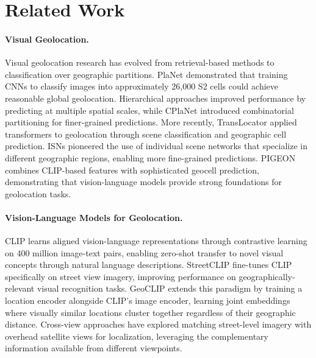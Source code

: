 \documentclass{uva-inf-article}
\begin{document}

\section{Related Work}
\label{sec:related}

\paragraph{Visual Geolocation.}
Visual geolocation research has evolved from retrieval-based methods \parencite{hays2008im2gps} to classification over geographic partitions. PlaNet \parencite{weyand2016planet} demonstrated that training CNNs to classify images into approximately 26,000 S2 cells \parencite{s2geometry} could achieve reasonable global geolocation. Hierarchical approaches \parencite{muller2018geolocation} improved performance by predicting at multiple spatial scales, while CPlaNet \parencite{seo2018cpl} introduced combinatorial partitioning for finer-grained predictions. More recently, TransLocator \parencite{pramanick2022world} applied transformers to geolocation through scene classification and geographic cell prediction. ISNs \parencite{muller2018geolocation} pioneered the use of individual scene networks that specialize in different geographic regions, enabling more fine-grained predictions. PIGEON \parencite{haas2024pigeon} combines CLIP-based features with sophisticated geocell prediction, demonstrating that vision-language models provide strong foundations for geolocation tasks.

\paragraph{Vision-Language Models for Geolocation.}
CLIP \parencite{radford2021learning} learns aligned vision-language representations through contrastive learning on 400 million image-text pairs, enabling zero-shot transfer to novel visual concepts through natural language descriptions. StreetCLIP \parencite{streetclip2023} fine-tunes CLIP specifically on street view imagery, improving performance on geographically-relevant visual recognition tasks. GeoCLIP \parencite{cepeda2023geoclip} extends this paradigm by training a location encoder alongside CLIP's image encoder, learning joint embeddings where visually similar locations cluster together regardless of their geographic distance. Cross-view approaches \parencite{toker2021satellite_cvpr} have explored matching street-level imagery with overhead satellite views for localization, leveraging the complementary information available from different viewpoints.
\end{document}
